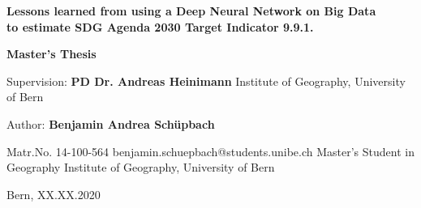 
	

\clearpage
\thispagestyle{empty}
\setlength{\hoffset}{-20mm}




\begin{tcolorbox}[standard jigsaw, colback=black, opacityback=1, width=620, opacityframe=0, coltext=white]
	

	{
	
	\bigbreak



		\textbf{{\Large Lessons learned from using a Deep Neural Network on Big Data\\ to estimate SDG Agenda 2030 Target Indicator 9.9.1.}}}



\end{tcolorbox}


\vspace{4cm}

\begin{tcolorbox}[standard jigsaw, colback=black, opacityback=0, width=350, opacityframe=0, coltext=white]
{	
    {\selectfont
	\smallbreak
	
	\Large 
	\textbf{Master's Thesis}
	\bigbreak\bigbreak
	
	\large
	\smallbreak
	Supervision: \bigbreak
	\textbf{PD Dr. Andreas Heinimann\bigbreak}
	Institute of Geography, University of Bern
	\bigbreak
	\bigbreak
	
	
	Author:\bigbreak	
	\textbf{Benjamin Andrea Schüpbach} \bigbreak
	
	Matr.No. 14-100-564
	\smallbreak
	benjamin.schuepbach@students.unibe.ch
	\smallbreak
	Master's Student in Geography
	\smallbreak
	Institute of Geography, University of Bern
	\bigbreak
	

	Bern, XX.XX.2020
	}


}
\end{tcolorbox}


\clearpage
\setlength{\hoffset}{0mm}





\newpage